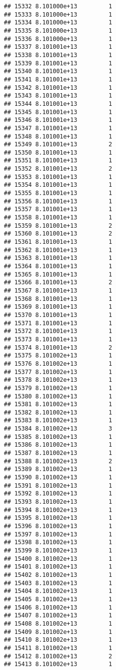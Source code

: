 \documentclass[
]{article}
\begin{document}
\begin{verbatim}
## 15332 8.101000e+13         1
## 15333 8.101000e+13         1
## 15334 8.101000e+13         1
## 15335 8.101000e+13         1
## 15336 8.101000e+13         1
## 15337 8.101001e+13         1
## 15338 8.101001e+13         1
## 15339 8.101001e+13         1
## 15340 8.101001e+13         1
## 15341 8.101001e+13         1
## 15342 8.101001e+13         1
## 15343 8.101001e+13         1
## 15344 8.101001e+13         1
## 15345 8.101001e+13         1
## 15346 8.101001e+13         1
## 15347 8.101001e+13         1
## 15348 8.101001e+13         1
## 15349 8.101001e+13         2
## 15350 8.101001e+13         1
## 15351 8.101001e+13         1
## 15352 8.101001e+13         2
## 15353 8.101001e+13         1
## 15354 8.101001e+13         1
## 15355 8.101001e+13         1
## 15356 8.101001e+13         1
## 15357 8.101001e+13         1
## 15358 8.101001e+13         1
## 15359 8.101001e+13         2
## 15360 8.101001e+13         2
## 15361 8.101001e+13         1
## 15362 8.101001e+13         1
## 15363 8.101001e+13         1
## 15364 8.101001e+13         1
## 15365 8.101001e+13         1
## 15366 8.101001e+13         2
## 15367 8.101001e+13         1
## 15368 8.101001e+13         1
## 15369 8.101001e+13         1
## 15370 8.101001e+13         1
## 15371 8.101001e+13         1
## 15372 8.101001e+13         1
## 15373 8.101001e+13         1
## 15374 8.101001e+13         2
## 15375 8.101002e+13         1
## 15376 8.101002e+13         1
## 15377 8.101002e+13         1
## 15378 8.101002e+13         1
## 15379 8.101002e+13         1
## 15380 8.101002e+13         1
## 15381 8.101002e+13         1
## 15382 8.101002e+13         1
## 15383 8.101002e+13         1
## 15384 8.101002e+13         3
## 15385 8.101002e+13         1
## 15386 8.101002e+13         1
## 15387 8.101002e+13         1
## 15388 8.101002e+13         2
## 15389 8.101002e+13         1
## 15390 8.101002e+13         1
## 15391 8.101002e+13         1
## 15392 8.101002e+13         1
## 15393 8.101002e+13         1
## 15394 8.101002e+13         1
## 15395 8.101002e+13         1
## 15396 8.101002e+13         1
## 15397 8.101002e+13         1
## 15398 8.101002e+13         1
## 15399 8.101002e+13         1
## 15400 8.101002e+13         1
## 15401 8.101002e+13         1
## 15402 8.101002e+13         1
## 15403 8.101002e+13         1
## 15404 8.101002e+13         1
## 15405 8.101002e+13         1
## 15406 8.101002e+13         1
## 15407 8.101002e+13         1
## 15408 8.101002e+13         1
## 15409 8.101002e+13         1
## 15410 8.101002e+13         1
## 15411 8.101002e+13         1
## 15412 8.101002e+13         2
## 15413 8.101002e+13         1

\end{verbatim}
\end{document}
